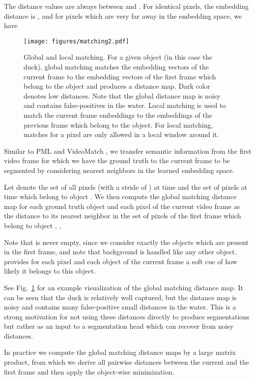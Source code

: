 \documentclass[10pt,twocolumn,letterpaper]{article}
\newcommand{\PAR}[1]{\vskip1pt \noindent {\bf #1~}}
\begin{document}
The distance values are always between  and . For identical pixels, the embedding distance is , and for pixels which are very far away in the embedding space, we have 

\PAR{Global Matching.}
\begin{figure}
\centering
\texttt{[image: figures/matching2.pdf]}
\caption{\label{fig:matching} Global and local matching. For a given object (in this case the duck), global matching matches the embedding vectors of the current frame to the embedding vectors of the first frame which belong to the object and produces a distance map. Dark color denotes low distances. Note that the global distance map is noisy and contains false-positives in the water.
Local matching is used to match the current frame embeddings to the embeddings of the previous frame which belong to the object. For local matching, matches for a pixel are only allowed in a local window around it.}
\end{figure}
Similar to PML \cite{Chen18CVPR} and VideoMatch \cite{Hu18ECCV}, we transfer semantic information from the first video frame for which we have the ground truth to the current frame to be segmented by considering nearest neighbors in the learned embedding space.

Let  denote the set of all pixels (with a stride of ) at time  and  the set of pixels at time  which belong to object . 
We then compute the global matching distance map  for each ground truth object  and each pixel  of the current video frame  as the distance to its nearest neighbor in the set of pixels  of the first frame which belong to object , \ie,

Note that  is never empty, since we consider exactly the objects  which are present in the first frame, and note that background is handled like any other object.  provides for each pixel and each object of the current frame a soft cue of how likely it belongs to this object. 

See Fig.~\ref{fig:matching} for an example visualization of the global matching distance map. It can be seen that the duck is relatively well captured, but the distance map is noisy and contains many false-positive small distances in the water. This is a strong motivation for not using these distances directly to produce segmentations but rather as an input to a segmentation head which can recover from noisy distances.

In practice we compute the global matching distance maps by a large matrix product, from which we derive all pairwise distances between the current and the first frame and then apply the object-wise minimization.
\end{document}

